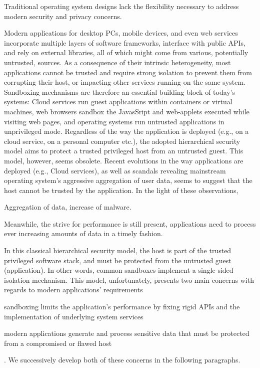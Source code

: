 Traditional operating system designs lack the flexibility necessary to address modern security and privacy concerns.


Modern applications for desktop PCs, mobile devices, and even web services incorporate multiple layers of software frameworks, interface with public APIs, and rely on external libraries, all of which might come from various, potentially untrusted, sources.
As a consequence of their intrinsic heterogeneity, most applications cannot be trusted and require strong isolation to prevent them from corrupting their host, or impacting other services running on the same system.
Sandboxing mechanisms are therefore an essential building block of today's systems: Cloud services run guest applications within containers or virtual machines, web browsers sandbox the JavasSript and web-applets executed while visiting web pages, and operating systems run untrusted applications in unprivileged mode.
Regardless of the way the application is deployed (e.g., on a cloud service, on a personal computer etc.), the adopted hierarchical security model aims to protect a trusted privileged host from an untrusted guest.
This model, however, seems obsolete.
Recent evolutions in the way applications are deployed (e.g., Cloud services), as well as scandals revealing mainstream operating system's aggressive aggregation of user data, seems to suggest that the host cannot be trusted by the application.
In the light of these observations, 

Aggregation of data, increase of malware.

Meanwhile, the strive for performance is still present, applications need to process ever increasing amounts of data in a timely fashion.


In this classical hierarchical security model, the host is part of the trusted privileged software stack, and must be protected from the untrusted guest (application).
In other words, common sandboxes implement a single-sided isolation mechanism.
This model, unfortunately, presents two main concerns with regards to modern applications' requirements
\begin{enumerate*}
	\item sandboxing limits the application's performance by fixing rigid APIs and the implementation of underlying system services
	\item modern applications generate and process sensitive data that must be protected from a compromised or flawed host
\end{enumerate*}.
We successively develop both of these concerns in the following paragraphs.

